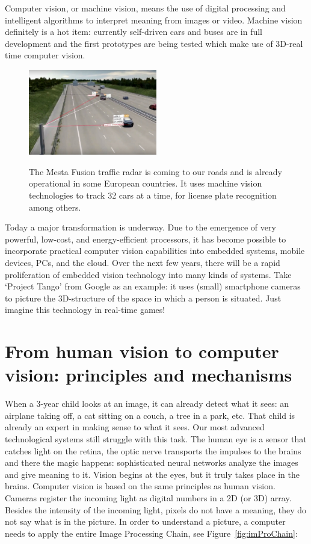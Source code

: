 Computer vision, or machine vision, means the use of digital processing and intelligent algorithms to interpret meaning from images or video. Machine vision definitely is a hot item: currently self-driven cars and buses are in full development and the first prototypes are being tested which make use of 3D-real time computer vision. 
\begin{figure}[h]
	\centering
	\includegraphics[width=0.5\textwidth]{../figures/Mesta-Fusion}
	\label{fig:flitspaal}
	\caption{The Mesta Fusion traffic radar is coming to our roads and is already operational in some European countries. It uses machine vision technologies to track 32 cars at a time, for license plate recognition among others.}
\end{figure}

Today a major transformation is underway. Due to the emergence of very powerful, low-cost, and energy-efficient processors, it has become possible to incorporate practical computer vision capabilities into embedded systems, mobile devices, PCs, and the cloud. Over the next few years, there will be a rapid proliferation of embedded vision technology into many kinds of systems. Take `Project Tango' from Google as an example: it uses (small) smartphone cameras to picture the 3D-structure of the space in which a person is situated. Just imagine this technology in real-time games!

\section{From human vision to computer vision: principles and mechanisms \label{sec:mechanisms}}
When a 3-year child looks at an image, it can already detect what it sees: an airplane taking off, a cat sitting on a couch, a tree in a park, etc. That child is already an expert in making sense to what it sees. Our most advanced technological systems still struggle with this task.
The human eye is a sensor that catches light on the retina, the optic nerve transports the impulses to the brains and there the magic happens: sophisticated neural networks analyze the images and give meaning to it. Vision begins at the eyes, but it truly takes place in the brains. 
Computer vision is based on the same principles as human vision. Cameras register the incoming light as digital numbers in a 2D (or 3D) array. Besides the intensity of the incoming light, pixels do not have a meaning, they do not say what is in the picture. In order to understand a picture, a computer needs to apply the entire Image Processing Chain, see Figure~\ref{fig:imProChain}:

